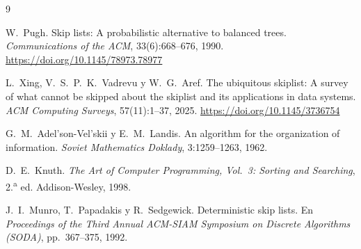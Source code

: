 \documentclass[11pt,a4paper]{article}
\begin{document}
\begin{thebibliography}{9}
\small
\setlength{\itemsep}{1pt}

W.~Pugh.
\newblock Skip lists: A probabilistic alternative to balanced trees.
\newblock \emph{Communications of the ACM}, 33(6):668--676, 1990.
\newblock \url{https://doi.org/10.1145/78973.78977}

L.~Xing, V.~S.~P.~K.~Vadrevu y W.~G.~Aref.
\newblock The ubiquitous skiplist: A survey of what cannot be skipped about the
skiplist and its applications in data systems.
\newblock \emph{ACM Computing Surveys}, 57(11):1--37, 2025.
\newblock \url{https://doi.org/10.1145/3736754}

G.~M.~Adel'son-Vel'skii y E.~M.~Landis.
\newblock An algorithm for the organization of information.
\newblock \emph{Soviet Mathematics Doklady}, 3:1259--1263, 1962.

D.~E.~Knuth.
\newblock \emph{The Art of Computer Programming, Vol.~3: Sorting and
Searching}, 2.\textsuperscript{a} ed.
\newblock Addison-Wesley, 1998.

J.~I.~Munro, T.~Papadakis y R.~Sedgewick.
\newblock Deterministic skip lists.
\newblock En \emph{Proceedings of the Third Annual ACM-SIAM Symposium on
Discrete Algorithms (SODA)}, pp.~367--375, 1992.

\end{thebibliography}
\end{document}
